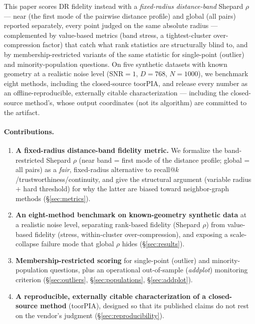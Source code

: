 \documentclass[11pt]{article}
\begin{document}
This paper scores DR fidelity instead with a \emph{fixed-radius
distance-band} Shepard $\rho$ --- near (the first mode of the pairwise
distance profile) and global (all pairs) reported separately, every point
judged on the same absolute radius --- complemented by value-based metrics
(band stress, a tightest-cluster over-compression factor) that catch what
rank statistics are structurally blind to, and by membership-restricted
variants of the same statistic for single-point (outlier) and
minority-population questions. On five synthetic datasets with known
geometry at a realistic noise level (SNR${=}1$, $D{=}768$, $N{=}1000$), we
benchmark eight methods, including the closed-source toorPIA, and release
every number as an offline-reproducible, externally citable
characterization --- including the closed-source method's, whose output
coordinates (not its algorithm) are committed to the artifact.

\paragraph{Contributions.}
\begin{enumerate}
  \item \textbf{A fixed-radius distance-band fidelity metric.} We formalize the
  band-restricted Shepard $\rho$ (near band = first mode of the distance
  profile; global = all pairs) as a \emph{fair}, fixed-radius alternative to
  recall@$k$/trustworthiness/continuity, and give the structural argument
  (variable radius $+$ hard threshold) for why the latter are biased toward
  neighbor-graph methods (\S\ref{sec:metrics}).
  \item \textbf{An eight-method benchmark on known-geometry synthetic data} at a
  realistic noise level, separating rank-based fidelity (Shepard $\rho$) from
  value-based fidelity (stress, within-cluster over-compression), and exposing
  a scale-collapse failure mode that global $\rho$ hides (\S\ref{sec:results}).
  \item \textbf{Membership-restricted scoring} for single-point (outlier) and
  minority-population questions, plus an operational out-of-sample
  (\emph{addplot}) monitoring criterion (\S\ref{sec:outliers},
  \S\ref{sec:populations}, \S\ref{sec:addplot}).
  \item \textbf{A reproducible, externally citable characterization of a
  closed-source method} (toorPIA), designed so that its published claims do not
  rest on the vendor's judgment (\S\ref{sec:reproducibility}).
\end{enumerate}
\end{document}
